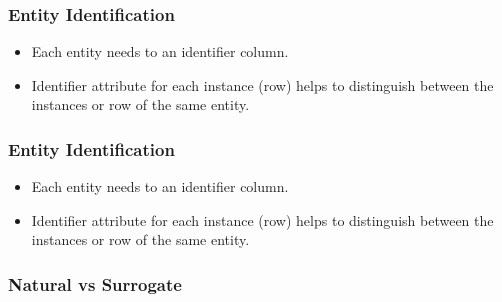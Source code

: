 \VideoClassification[column=2, colour=blue]
\begin{frame}
\frametitle{Entity Identification}
	\begin{itemize}[<+->]
		\item Each entity needs to an identifier column.
		\item Identifier attribute for each instance (row) helps to distinguish between the instances or row of the same entity.		
	\end{itemize}

\end{frame}
\begin{frame}
	\frametitle{Entity Identification}
	\begin{itemize}
		\item Each entity needs to an identifier column.
		\item Identifier attribute for each instance (row) helps to distinguish between the instances or row of the same entity.		
	\end{itemize}

	\centering
	
	
\end{frame}

\begin{frame}
	\frametitle{Natural vs Surrogate}
	\hspace{.5cm}
\end{frame}


